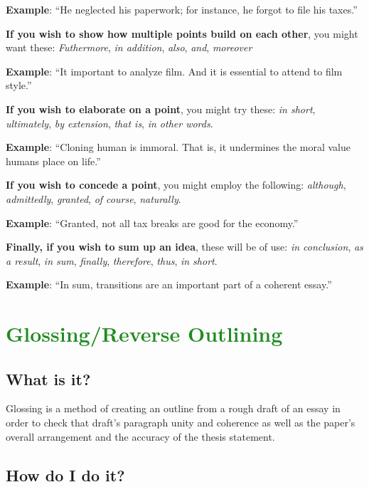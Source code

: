 \documentclass[12pt, hidelinks]{article} %
\newcommand{\tab}{\hspace*{2em}}
\begin{document}
\tab \textbf{Example}: ``He neglected his paperwork; for instance, he forgot to file his taxes.''

\textbf{If you wish to show how multiple points build on each other}, you might want these: \emph{Futhermore}, \emph{in addition}, \emph{also}, \emph{and}, \emph{moreover}

\tab \textbf{Example}: ``It important to analyze film.  And it is essential to attend to film style.''

\textbf{If you wish to elaborate on a point}, you might try these: \emph{in short}, \emph{ultimately}, \emph{by extension}, \emph{that is}, \emph{in other words}.

\tab \textbf{Example}: ``Cloning human is immoral. That is, it undermines the moral value humans place on life.''
        
\textbf{If you wish to concede a point}, you might employ the following: \emph{although}, \emph{admittedly}, \emph{granted}, \emph{of course}, \emph{naturally}.

\tab \textbf{Example}: ``Granted, not all tax breaks are good for the economy.''
        	
\textbf{Finally, if you wish to sum up an idea}, these will be of use: \emph{in conclusion}, \emph{as a result}, \emph{in sum}, \emph{finally}, \emph{therefore}, \emph{thus}, \emph{in short}.

\tab \textbf{Example}: ``In sum, transitions are an important part of a coherent essay.''
              	

\section{\textcolor{ForestGreen}{Glossing/Reverse Outlining}}

\subsection{What is it?}

Glossing is a method of creating an outline from a rough draft of an essay in order to check that draft's paragraph unity and coherence as well as the paper's overall arrangement and the accuracy of the thesis statement.

\subsection{How do I do it?}
\end{document}
